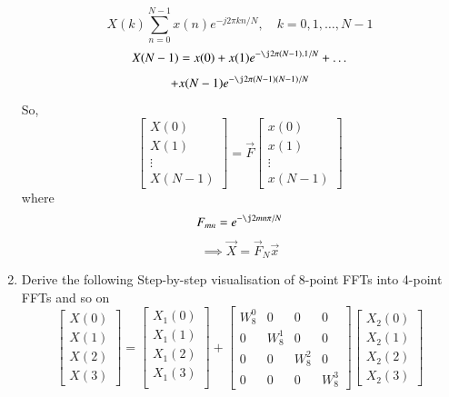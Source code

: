 \documentclass[journal,12pt,twocolumn]{IEEEtran}
\renewcommand\thesection{\arabic{section}}
\begin{document}
\begin{enumerate}[label=\thesection.\arabic*]
\solution
\[X(k) \sum_{n=0}^{N-1} x(n) e^{-j 2 \pi k n / N}, \quad k=0,1, \ldots, N-1\]
\[X(N-1) = x(0) + x(1)e^{-\j2\pi(N-1).1/N} + \ldots\]\[+ x(N-1)e^{-\j2\pi(N-1)(N-1)/N}\]
So,
\[
\begin{bmatrix}
    X(0)\\
    X(1)\\
    \vdots\\
    X(N-1)
\end{bmatrix}
=
\vec{F}
\begin{bmatrix}
    x(0)\\
    x(1)\\
    \vdots\\
    x(N-1)
\end{bmatrix}
\]
where
\[F_{mn} = e^{-\j2mn\pi/N}\]
\[\implies \vec{X} = \vec{F}_N \vec{x}\]
\item Derive the following Step-by-step visualisation  of
8-point FFTs into 4-point FFTs and so on
\begin{equation}
\begin{bmatrix}
X(0) \\ 
X(1) \\ 
X(2) \\ 
X(3)
\end{bmatrix}
=
\begin{bmatrix}
X_{1}(0) \\ 
X_{1}(1)\\ 
X_{1}(2)\\
X_{1}(3)\\
\end{bmatrix}
+
\begin{bmatrix}
W^{0}_{8} & 0 & 0 & 0\\
0 & W^{1}_{8} & 0 & 0\\
0 & 0 & W^{2}_{8} & 0\\
0 & 0 & 0 & W^{3}_{8}
\end{bmatrix}
\begin{bmatrix}
X_{2}(0) \\ 
X_{2}(1) \\ 
X_{2}(2) \\
X_{2}(3)
\end{bmatrix}
\end{equation}


\end{enumerate}
\end{document}
